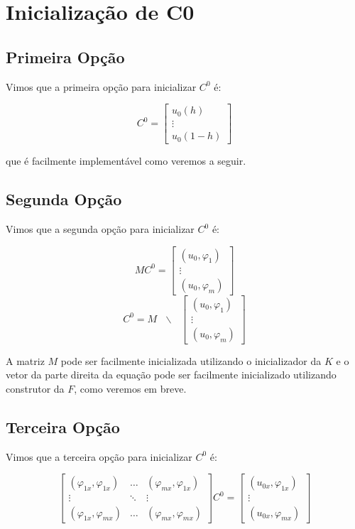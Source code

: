 \section{Inicialização de C0}
\subsection{Primeira Opção}

  Vimos que a primeira opção para inicializar $C^0$ é:

  \[C^0 = \begin{bmatrix} u_0(h) \\ \vdots \\ u_0(1-h) \end{bmatrix}\]

  que é facilmente implementável como veremos a seguir.

\subsection{Segunda Opção}

  Vimos que a segunda opção para inicializar $C^0$ é:

  \[MC^0 = \begin{bmatrix} (u_0, \varphi_1) \\ \vdots \\ (u_0, \varphi_m) \end{bmatrix}\]
  \[C^0 = M \text{ }\backslash\text{ } \begin{bmatrix} (u_0, \varphi_1) \\ \vdots \\ (u_0, \varphi_m) \end{bmatrix}\]

  A matriz $M$ pode ser facilmente inicializada utilizando o inicializador da $K$ e o vetor da parte direita da equação pode ser facilmente inicializado utilizando construtor da $F$, como veremos em breve.

\subsection{Terceira Opção}

  Vimos que a terceira opção para inicializar $C^0$ é:

  \[\begin{bmatrix}
    (\varphi_{1x}, \varphi_{1x}) & \dots & (\varphi_{mx}, \varphi_{1x}) \\
    \vdots & \ddots &\vdots \\
    (\varphi_{1x}, \varphi_{mx}) & \dots & (\varphi_{mx}, \varphi_{mx})
  \end{bmatrix}
  C^0 =
  \begin{bmatrix}
    (u_{0x}, \varphi_{1x}) \\ \vdots \\ (u_{0x}, \varphi_{mx})
  \end{bmatrix}\]

